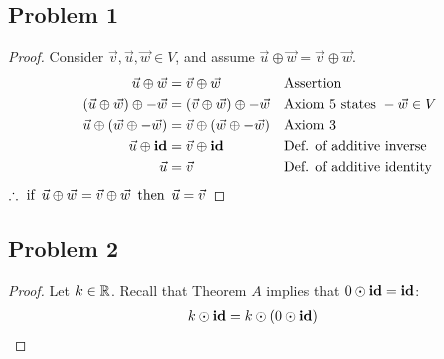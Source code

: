 




\subsection*{Problem 1}
\begin{proof}
  Consider $\vec{v}, \vec{u}, \vec{w} \in V$, and assume $\vec{u} \oplus \vec{w} = \vec{v} \oplus \vec{w}$.
  \begin{align*}
    \vec{u} \oplus \vec{w}                   & = \vec{v} \oplus \vec{w}                   &  & \text{Assertion}                     \\
    (\vec{u} \oplus \vec{w}) \oplus -\vec{w} & = (\vec{v} \oplus \vec{w}) \oplus -\vec{w} &  & \text{Axiom 5 states}~-\vec{w} \in V \\
    \vec{u} \oplus (\vec{w} \oplus -\vec{w}) & = \vec{v} \oplus (\vec{w} \oplus -\vec{w}) &  & \text{Axiom 3}                       \\
    \vec{u} \oplus \operatorname{\textbf{id}}                  & = \vec{v} \oplus \operatorname{\textbf{id}}                  &  & \text{Def. of additive inverse}      \\
    \vec{u}                                  & = \vec{v}                                  &  & \text{Def. of additive identity}
  \end{align*}
  $\therefore \operatorname{~\text{if}~} \vec{u} \oplus \vec{w} = \vec{v} \oplus \vec{w} \operatorname{~\text{then}~} \vec{u} = \vec{v}$
\end{proof}

\subsection*{Problem 2}
\begin{proof}
  Let $k \in \mathbb{R}$. Recall that Theorem $A$ implies that $0 \odot \operatorname{\textbf{id}} = \operatorname{\textbf{id}}$:
  \begin{align*}
    k \odot \operatorname{\textbf{id}} & = k \odot (0 \odot \operatorname{\textbf{id}})
  \end{align*}
\end{proof}

